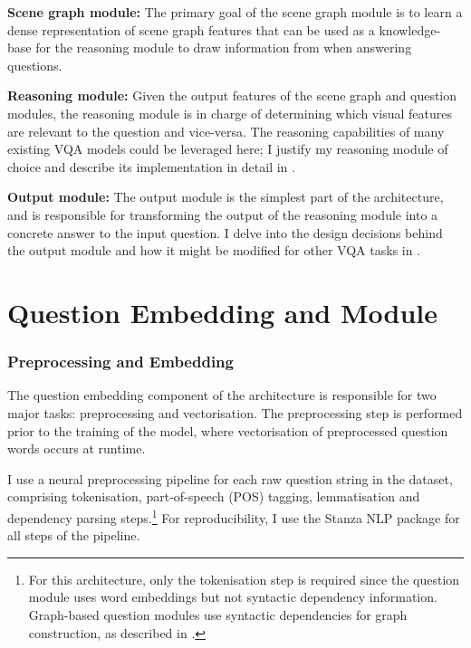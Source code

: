 \textbf{Scene graph module:} The primary goal of the scene graph module is to learn a dense representation of scene graph features that can be used as a knowledge-base for the reasoning module to draw information from when answering questions.

\textbf{Reasoning module:} Given the output features of the scene graph and question modules, the reasoning module is in charge of determining which visual features are relevant to the question and vice-versa. The reasoning capabilities of many existing VQA models could be leveraged here; I justify my reasoning module of choice and describe its implementation in detail in \sectionautorefname{ \ref{section:reasoning_module}}.

\textbf{Output module:} The output module is the simplest part of the architecture, and is responsible for transforming the output of the reasoning module into a concrete answer to the input question. I delve into the design decisions behind the output module and how it might be modified for other VQA tasks in \sectionautorefname{ \ref{section:output_module}}.

\section{Question Embedding and Module}
\label{section:question_embedding_and_module}

\subsubsection{Preprocessing and Embedding}

The question embedding component of the architecture is responsible for two major tasks: preprocessing and vectorisation. The preprocessing step is performed prior to the training of the model, where vectorisation of preprocessed question words occurs at runtime. 

I use a neural preprocessing pipeline for each raw question string in the dataset, comprising tokenisation, part-of-speech (POS) tagging, lemmatisation and dependency parsing steps.\footnote{For this architecture, only the tokenisation step is required since the question module uses word embeddings but not syntactic dependency information. Graph-based question modules use syntactic dependencies for graph construction, as described in \subsectionautorefname{ \ref{subsec:question_module_ablations}}.} For reproducibility, I use the Stanza NLP package \cite{qi2020stanza} for all steps of the pipeline.

